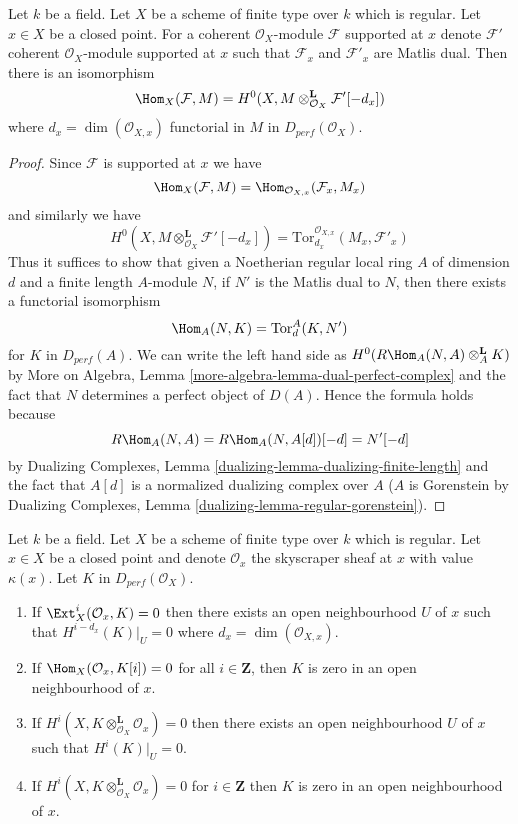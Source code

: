 \begin{lemma}
\label{lemma-duality-at-point}
Let $k$ be a field. Let $X$ be a scheme of finite type over $k$ which
is regular. Let $x \in X$ be a closed point. For a coherent
$\mathcal{O}_X$-module $\mathcal{F}$ supported at $x$ denote
$\mathcal{F}'$ coherent $\mathcal{O}_X$-module supported at $x$
such that $\mathcal{F}_x$ and $\mathcal{F}'_x$ are Matlis dual.
Then there is an isomorphism
$$
\Hom_X(\mathcal{F}, M) =
H^0(X, M \otimes_{\mathcal{O}_X}^\mathbf{L} \mathcal{F}'[-d_x])
$$
where $d_x = \dim(\mathcal{O}_{X, x})$
functorial in $M$ in $D_{perf}(\mathcal{O}_X)$.
\end{lemma}

\begin{proof}
Since $\mathcal{F}$ is supported at $x$ we have
$$
\Hom_X(\mathcal{F}, M) =
\Hom_{\mathcal{O}_{X, x}}(\mathcal{F}_x, M_x)
$$
and similarly we have
$$
H^0(X, M \otimes_{\mathcal{O}_X}^\mathbf{L} \mathcal{F}'[-d_x]) =
\text{Tor}^{\mathcal{O}_{X, x}}_{d_x}(M_x, \mathcal{F}'_x)
$$
Thus it suffices to show that given a Noetherian regular local ring $A$
of dimension $d$ and a finite length $A$-module $N$, if
$N'$ is the Matlis dual to $N$, then there exists a functorial isomorphism
$$
\Hom_A(N, K) = \text{Tor}^A_d(K, N')
$$
for $K$ in $D_{perf}(A)$. We can write the left hand side as
$H^0(R\Hom_A(N, A) \otimes_A^\mathbf{L} K)$ by
More on Algebra, Lemma \ref{more-algebra-lemma-dual-perfect-complex}
and the fact that $N$ determines a perfect object of $D(A)$.
Hence the formula holds because
$$
R\Hom_A(N, A) = R\Hom_A(N, A[d])[-d] = N'[-d]
$$
by Dualizing Complexes, Lemma \ref{dualizing-lemma-dualizing-finite-length}
and the fact that $A[d]$ is a normalized dualizing complex over $A$
($A$ is Gorenstein by
Dualizing Complexes, Lemma \ref{dualizing-lemma-regular-gorenstein}).
\end{proof}

\begin{lemma}
\label{lemma-orthogonal-point-sheaf}
Let $k$ be a field. Let $X$ be a scheme of finite type over $k$ which
is regular. Let $x \in X$ be a closed point and denote $\mathcal{O}_x$
the skyscraper sheaf at $x$ with value $\kappa(x)$. Let $K$ in
$D_{perf}(\mathcal{O}_X)$.
\begin{enumerate}
\item If $\Ext^i_X(\mathcal{O}_x, K) = 0$ then there exists an open
neighbourhood $U$ of $x$ such that $H^{i - d_x}(K)|_U = 0$ where
$d_x = \dim(\mathcal{O}_{X, x})$.
\item If $\Hom_X(\mathcal{O}_x, K[i]) = 0$ for all
$i \in \mathbf{Z}$, then $K$ is zero in an open neighbourhood of $x$.
\item If $H^i(X, K \otimes_{\mathcal{O}_X}^\mathbf{L} \mathcal{O}_x) = 0$
then there exists an open neighbourhood $U$ of $x$ such that
$H^i(K)|_U = 0$.
\item If $H^i(X, K \otimes_{\mathcal{O}_X}^\mathbf{L} \mathcal{O}_x) = 0$
for $i \in \mathbf{Z}$ then $K$ is zero in an
open neighbourhood of $x$.
\end{enumerate}
\end{lemma}

